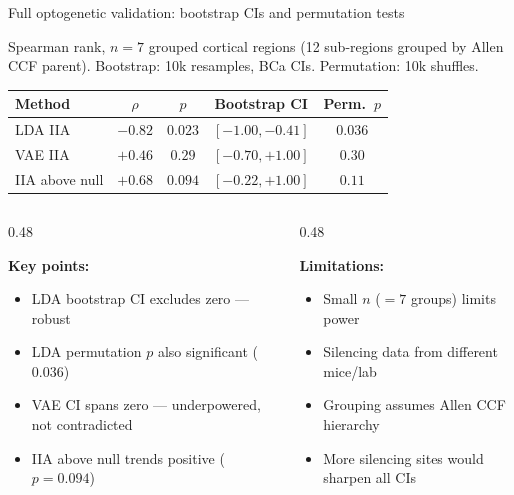 \documentclass[aspectratio=169,11pt]{beamer}
\begin{document}
\begin{frame}{Full optogenetic validation: bootstrap CIs and permutation tests}

\vspace{-0.3em}
{\scriptsize Spearman rank, $n = 7$ grouped cortical regions (12 sub-regions grouped by Allen CCF parent). Bootstrap: 10k resamples, BCa CIs. Permutation: 10k shuffles.}

\vspace{0.2em}
\begin{center}
{\scriptsize
\begin{tabular}{lcccc}
\toprule
\textbf{Method} & \textbf{$\rho$} & \textbf{$p$} & \textbf{Bootstrap CI} & \textbf{Perm.\ $p$} \\
\midrule
LDA IIA & $\mathbf{-0.82}$ & $\mathbf{0.023}$ & $[-1.00, -0.41]$ & $0.036$ \\
VAE IIA & $+0.46$ & $0.29$ & $[-0.70, +1.00]$ & $0.30$ \\
IIA above null & $+0.68$ & $0.094$ & $[-0.22, +1.00]$ & $0.11$ \\
\bottomrule
\end{tabular}
}
\end{center}

\vspace{0.2em}
\begin{columns}[T]
\begin{column}{0.48\textwidth}
{\small \textbf{Key points:}
\begin{itemize}\setlength\itemsep{0.1em}
  \item LDA bootstrap CI excludes zero --- robust
  \item LDA permutation $p$ also significant ($0.036$)
  \item VAE CI spans zero --- underpowered, not contradicted
  \item IIA above null trends positive ($p = 0.094$)
\end{itemize}
}
\end{column}
\begin{column}{0.48\textwidth}
{\small \textbf{Limitations:}
\begin{itemize}\setlength\itemsep{0.1em}
  \item Small $n$ ($= 7$ groups) limits power
  \item Silencing data from different mice/lab
  \item Grouping assumes Allen CCF hierarchy
  \item More silencing sites would sharpen all CIs
\end{itemize}
}
\end{column}
\end{columns}
\end{frame}
\end{document}
